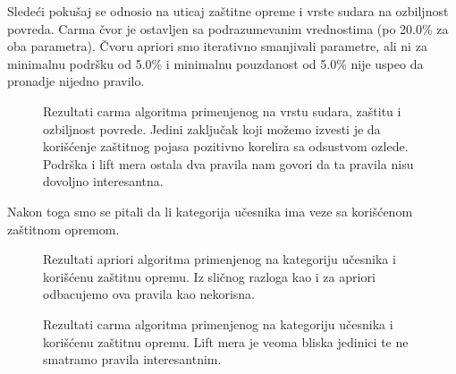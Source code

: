 \documentclass[a4paper,10pt]{article}
\begin{document}
Sledeći pokušaj se odnosio na uticaj zaštitne opreme i vrste sudara na ozbiljnost povreda. Carma čvor je ostavljen sa 
podrazumevanim vrednostima (po 20.0\% za oba parametra). Čvoru apriori smo iterativno smanjivali parametre, ali ni za minimalnu
podršku od 5.0\% i minimalnu pouzdanost od 5.0\% nije uspeo da pronadje nijedno pravilo.

\begin{figure}[h!]
 \centering
 \caption{Rezultati carma algoritma primenjenog na vrstu sudara, zaštitu i ozbiljnost povrede. Jedini zaključak koji
 možemo izvesti je da korišćenje zaštitnog pojasa pozitivno korelira sa odsustvom ozlede. Podrška i lift mera ostala dva pravila
 nam govori da ta pravila nisu dovoljno interesantna. }
\end{figure}

Nakon toga smo se pitali da li kategorija učesnika ima veze sa korišćenom zaštitnom opremom. 

\begin{figure}[h!]
 \centering
 \caption{Rezultati apriori algoritma primenjenog na kategoriju učesnika i korišćenu zaštitnu opremu. Iz sličnog razloga kao i za 
 apriori odbacujemo ova pravila kao nekorisna. }
\end{figure}

\begin{figure}[h!]
 \centering
 \caption{Rezultati carma algoritma primenjenog na kategoriju učesnika i korišćenu zaštitnu opremu. Lift mera je veoma bliska 
 jedinici te ne smatramo pravila interesantnim. }
\end{figure}
\end{document}
